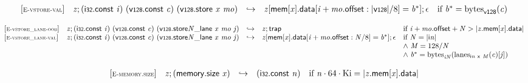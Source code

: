 $$\begin{array}{@{}l@{}lcl@{}l@{}}
{[\textsc{\scriptsize E{-}vstore{-}val}]} \quad & {\mathit{z}} ; (\mathsf{i{\scriptstyle32}}.\mathsf{const}~{\mathit{i}})~(\mathsf{v{\scriptstyle128}}.\mathsf{const}~{\mathit{c}})~(\mathsf{v{\scriptstyle128}.store}~{\mathit{x}}~{\mathit{mo}}) &\hookrightarrow& {\mathit{z}}[\mathsf{mem}[{\mathit{x}}].\mathsf{data}[{\mathit{i}} + {\mathit{mo}}.\mathsf{offset} : {|\mathsf{v{\scriptstyle128}}|} / 8] = {{\mathit{b}}^\ast}] ; \epsilon &\quad
  \mbox{if}~{{\mathit{b}}^\ast} = {{\mathrm{bytes}}}_{\mathsf{v{\scriptstyle128}}}({\mathit{c}}) \\
\end{array}
$$

\vspace{1ex}

$$
\begin{array}{@{}l@{}lcl@{}l@{}}
{[\textsc{\scriptsize E{-}vstore\_lane{-}oob}]} \quad & {\mathit{z}} ; (\mathsf{i{\scriptstyle32}}.\mathsf{const}~{\mathit{i}})~(\mathsf{v{\scriptstyle128}}.\mathsf{const}~{\mathit{c}})~({{{\mathsf{v{\scriptstyle128}.store}}{{\mathit{N}}}}{\mathsf{\_}}}{\mathsf{lane}}~{\mathit{x}}~{\mathit{mo}}~{\mathit{j}}) &\hookrightarrow& {\mathit{z}} ; \mathsf{trap} &\quad
  \mbox{if}~{\mathit{i}} + {\mathit{mo}}.\mathsf{offset} + {\mathit{N}} > {|{{\mathit{z}}.\mathsf{mem}}{[{\mathit{x}}]}.\mathsf{data}|} \\
{[\textsc{\scriptsize E{-}vstore\_lane{-}val}]} \quad & {\mathit{z}} ; (\mathsf{i{\scriptstyle32}}.\mathsf{const}~{\mathit{i}})~(\mathsf{v{\scriptstyle128}}.\mathsf{const}~{\mathit{c}})~({{{\mathsf{v{\scriptstyle128}.store}}{{\mathit{N}}}}{\mathsf{\_}}}{\mathsf{lane}}~{\mathit{x}}~{\mathit{mo}}~{\mathit{j}}) &\hookrightarrow& {\mathit{z}}[\mathsf{mem}[{\mathit{x}}].\mathsf{data}[{\mathit{i}} + {\mathit{mo}}.\mathsf{offset} : {\mathit{N}} / 8] = {{\mathit{b}}^\ast}] ; \epsilon &\quad
  \mbox{if}~{\mathit{N}} = {|{\mathsf{i}}{{\mathit{n}}}|} \\
 &&&&\quad {\land}~{\mathit{M}} = 128 / {\mathit{N}} \\
 &&&&\quad {\land}~{{\mathit{b}}^\ast} = {{\mathrm{bytes}}}_{{{\mathit{i}}}{{\mathit{N}}}}({{\mathrm{lanes}}}_{{\mathsf{i}}{{\mathit{n}}}~\mathsf{x}~{\mathit{M}}}({\mathit{c}})[{\mathit{j}}]) \\
\end{array}
$$

\vspace{1ex}

$$
\begin{array}{@{}l@{}lcl@{}l@{}}
{[\textsc{\scriptsize E{-}memory.size}]} \quad & {\mathit{z}} ; (\mathsf{memory.size}~{\mathit{x}}) &\hookrightarrow& (\mathsf{i{\scriptstyle32}}.\mathsf{const}~{\mathit{n}}) &\quad
  \mbox{if}~{\mathit{n}} \cdot 64 \cdot {\mathrm{Ki}} = {|{{\mathit{z}}.\mathsf{mem}}{[{\mathit{x}}]}.\mathsf{data}|} \\
\end{array}
$$

